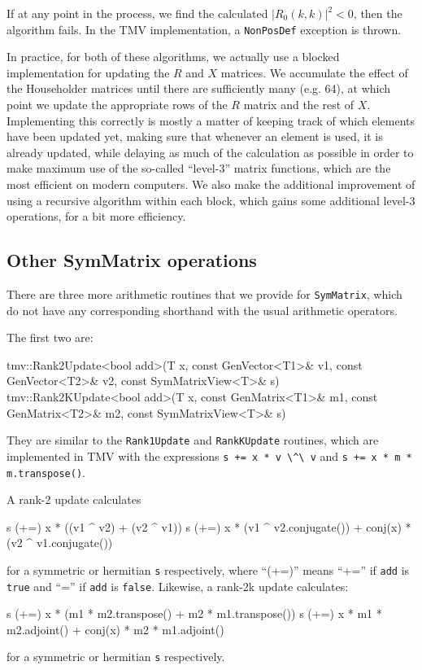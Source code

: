\documentclass[twoside,letterpaper,11pt]{article}
\renewcommand{\tt}[1]{{\lstinline {#1}}}
\begin{document}
If at any point in the process, we find the calculated $|R_0(k,k)|^2 < 0$, then 
the algorithm fails.  In the TMV implementation, a \tt{NonPosDef} exception is thrown.

In practice, for both of these algorithms, we actually use a blocked implementation for updating
the $R$ and $X$ matrices.  We accumulate the effect of the Householder matrices until 
there are sufficiently many (e.g. 64), at which point we update the appropriate rows of the $R$
matrix and the rest of $X$.  Implementing this correctly is mostly a matter of keeping track
of which elements have been updated yet, making sure that whenever an element is used,
it is already updated, while delaying as much of the calculation as possible in order 
to make maximum
use of the so-called ``level-3'' matrix functions, which are the most efficient on modern computers.
We also make the additional improvement of using a recursive algorithm within each block,
which gains some additional level-3 operations, for a bit more efficiency.

\subsection{Other SymMatrix operations}
\label{SymMatrix_Ops}

There are three more arithmetic routines that we provide for \tt{SymMatrix},
which do not have
any corresponding shorthand with the usual arithmetic operators.

The first two are:
\begin{tmvcode}
tmv::Rank2Update<bool add>(T x, const GenVector<T1>& v1, 
      const GenVector<T2>& v2, const SymMatrixView<T>& s)
tmv::Rank2KUpdate<bool add>(T x, const GenMatrix<T1>& m1, 
      const GenMatrix<T2>& m2, const SymMatrixView<T>& s)
\end{tmvcode}
They are similar to the \tt{Rank1Update} and \tt{RankKUpdate} routines,
which are implemented in TMV with the expressions 
\tt{s += x * v \^\ v} and \tt{s += x * m * m.transpose()}.

A rank-2 update calculates
\begin{tmvcode}
s (+=) x * ((v1 ^ v2) + (v2 ^ v1))
s (+=) x * (v1 ^ v2.conjugate()) + conj(x) * (v2 ^ v1.conjugate())
\end{tmvcode}
for a symmetric or hermitian \tt{s} respectively,
where ``(+=)'' means ``+='' if \tt{add} is \tt{true} and ``='' 
if \tt{add} is \tt{false}.
Likewise, a rank-2k update calculates:
\begin{tmvcode}
s (+=) x * (m1 * m2.transpose() + m2 * m1.transpose())
s (+=) x * m1 * m2.adjoint() + conj(x) * m2 * m1.adjoint()
\end{tmvcode}
for a symmetric or hermitian \tt{s} respectively.
\end{document}
